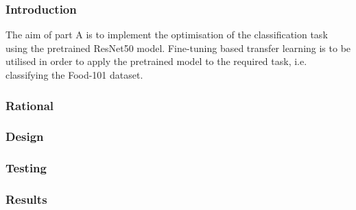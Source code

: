 \subsubsection{Introduction}

The aim of part A is to implement the optimisation of the classification task
using the pretrained ResNet50 model. Fine-tuning based transfer learning is to
be utilised in order to apply the pretrained model to the required task, i.e.
classifying the Food-101 dataset.

\subsubsection{Rational}



\subsubsection{Design}

\subsubsection{Testing}

\subsubsection{Results}
